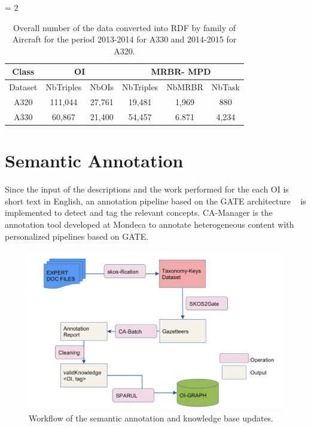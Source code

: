 \documentclass[a4paper,english,submission]{rnti}  %
\begin{document}


\begin{table}[!htb]
\begin{center}
   \tabcolsep = 2\tabcolsep
\begin{tabular}{|c|c|c||c|c|c|}

\hline 
Class & \multicolumn{2}{c||}{OI} & \multicolumn{3}{c|}{MRBR- MPD} \\ 
\hline 
Dataset & NbTriples & NbOIs & NbTriples & NbMRBR & NbTask \\ 
\hline 
A320 & 111,044 & 27,761 & 19,481 & 1,969 & 880 \\ 
\hline 
A330 & 60,867 & 21,400 & 54,457 & 6.871 & 4,234 \\ 
\hline  

\end{tabular} 
\caption{Overall number of the data converted into RDF by family of Aircraft for the period 2013-2014 for A330 and 2014-2015 for A320.}
\label{tab:graphdata}
\end{center}
\end{table}

\section{Semantic Annotation}
\label{sec:annotation}

Since the input of the descriptions and the work performed for the each OI is short text in English, an annotation pipeline based on the GATE architecture ~\cite{gatearch,kenter2005gate} is implemented to detect and tag the relevant concepts. CA-Manager is the annotation tool developed at Mondeca to annotate heterogeneous content with personalized pipelines based on GATE. 

\begin{figure}[!htb]
\centering
\includegraphics[scale=0.4]{img/archi-oi.png} 
\caption{Workflow of the semantic annotation and knowledge base updates.}
\label{figarchi}
\end{figure}
\end{document}
